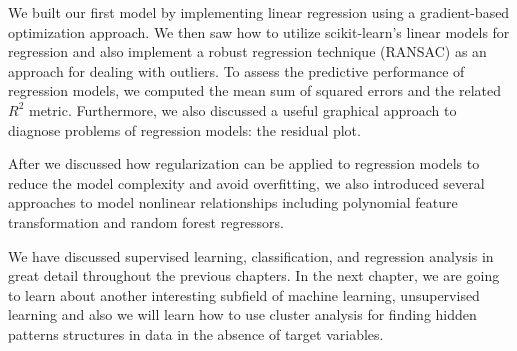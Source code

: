 \documentclass[11pt]{article}
\begin{document}
We built our first model by implementing linear regression using a
gradient-based optimization approach. We then saw how to utilize
scikit-learn's linear models for regression and also implement a robust
regression technique (RANSAC) as an approach for dealing with outliers.
To assess the predictive performance of regression models, we computed
the mean sum of squared errors and the related \(R^2\) metric.
Furthermore, we also discussed a useful graphical approach to diagnose
problems of regression models: the residual plot.

After we discussed how regularization can be applied to regression
models to reduce the model complexity and avoid overfitting, we also
introduced several approaches to model nonlinear relationships including
polynomial feature transformation and random forest regressors.

We have discussed supervised learning, classification, and regression
analysis in great detail throughout the previous chapters. In the next
chapter, we are going to learn about another interesting subfield of
machine learning, unsupervised learning and also we will learn how to
use cluster analysis for finding hidden patterns structures in data in
the absence of target variables.


    
    
    
    
\end{document}
